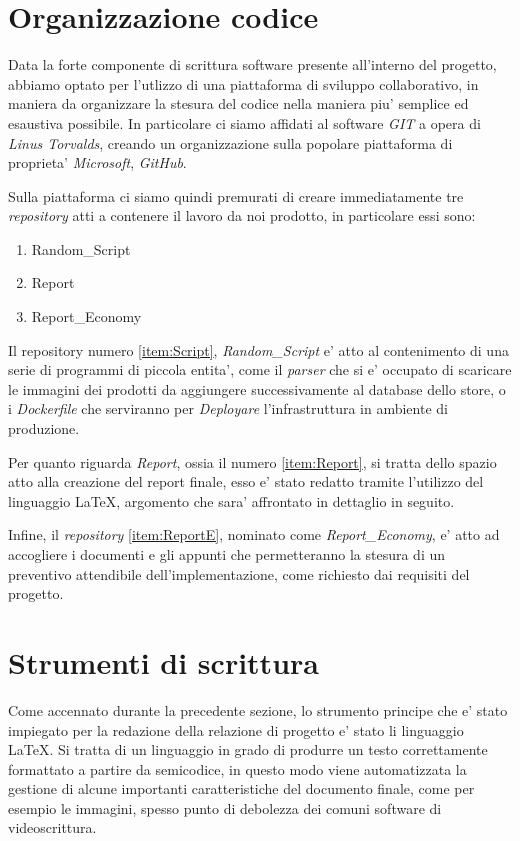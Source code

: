\documentclass[a4paper]{report}
\begin{document}
	\section{Organizzazione codice}
		Data la forte componente di scrittura software presente all'interno del progetto, abbiamo optato per l'utlizzo
		di una piattaforma di sviluppo collaborativo, in maniera da organizzare la stesura del codice nella maniera piu'
		semplice ed esaustiva possibile. In particolare ci siamo affidati al software \emph{GIT} a opera di \emph{Linus
		Torvalds}, creando un organizzazione sulla popolare piattaforma di proprieta' \emph{Microsoft}, \emph{GitHub}.

		Sulla piattaforma ci siamo quindi premurati di creare immediatamente tre \emph{repository} atti a contenere il
		lavoro da noi prodotto, in particolare essi sono:
		\begin{enumerate}
			\item Random\_Script\label{item:Script}
			\item Report\label{item:Report}
			\item Report\_Economy\label{item:ReportE}
		\end{enumerate}

		Il repository numero \ref{item:Script}{, \emph{Random\_Script}} e' atto al contenimento di una serie di
		programmi di piccola entita', come il \emph{parser} che si e' occupato di scaricare le immagini dei prodotti da
		aggiungere successivamente al database dello store, o i \emph{Dockerfile} che serviranno per \emph{Deployare}
		l'infrastruttura in ambiente di produzione.

		Per quanto riguarda \emph{Report}, ossia il numero \ref{item:Report}, si tratta dello spazio atto alla creazione
		del report finale, esso e' stato redatto tramite l'utilizzo del linguaggio \LaTeX{}, argomento che sara'
		affrontato in dettaglio in seguito.

		Infine, il \emph{repository} \ref{item:ReportE}, nominato come \emph{Report\_Economy}, e' atto ad accogliere i
		documenti e gli appunti che permetteranno la stesura di un preventivo attendibile dell'implementazione, come
		richiesto dai requisiti del progetto.
	\section{Strumenti di scrittura}
		Come accennato durante la precedente sezione, lo strumento principe che e' stato impiegato per la redazione
		della relazione di progetto e' stato li linguaggio \LaTeX{}. Si tratta di un linguaggio in grado di produrre un
		testo correttamente formattato a partire da semicodice, in questo modo viene automatizzata la gestione di alcune
		importanti caratteristiche del documento finale, come per esempio le immagini, spesso punto di debolezza dei
		comuni software di videoscrittura.
\end{document}
